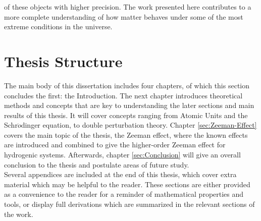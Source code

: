 of these objects with higher precision. The work presented here contributes to a more complete understanding of how matter behaves under some of the most extreme conditions in the universe.
    \section{Thesis Structure}
        The main body of this dissertation includes four chapters, of which this section concludes the first: the Introduction. The next chapter introduces theoretical methods and concepts that are key to understanding the later sections and main results of this thesis. It will cover concepts ranging from Atomic Units and the Schr$\ddot{o}$dinger equation, to double perturbation theory. Chapter \ref{sec:Zeeman-Effect} covers the main topic of the thesis, the Zeeman effect, where the known effects are introduced and combined to give the higher-order Zeeman effect for hydrogenic systems. Afterwards, chapter \ref{sec:Conclusion} will give an overall conclusion to the thesis and postulate areas of future study.\\

        Several appendices are included at the end of this thesis, which cover extra material which may be helpful to the reader. These sections are either provided as a convenience to the reader for a reminder of mathematical properties and tools, or display full derivations which are summarized in the relevant sections of the work.

